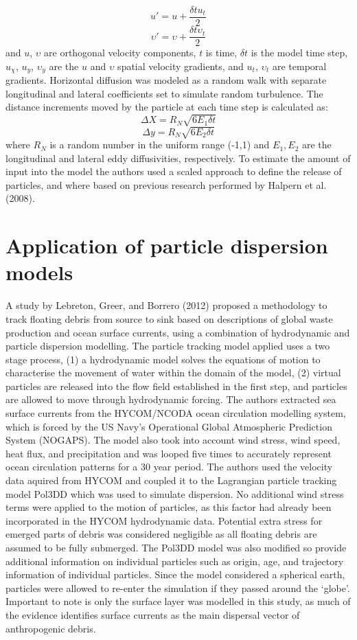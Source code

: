 \documentclass[
]{article}
\begin{document}
\[u'= u + \frac{\delta tu_t}{2}\]
\[\upsilon'=\upsilon + \frac{\delta t\upsilon_t}{2}\] and \(u\),
\(\upsilon\) are orthogonal velocity components, \(t\) is time,
\(\delta t\) is the model time step, \(u_\chi\), \(u_y\), \(\upsilon_y\)
are the \(u\) and \(\upsilon\) spatial velocity gradients, and \(u_t\),
\(\upsilon_t\) are temporal gradients. Horizontal diffusion was modeled
as a random walk with separate longitudinal and lateral coefficients set
to simulate random turbulence. The distance increments moved by the
particle at each time step is calculated as:
\[\Delta X = R_N \sqrt{6E_1\delta t}\]
\[\Delta y = R_N\sqrt{6E_2\delta t}\] where \(R_N\) is a random number
in the uniform range (-1,1) and \(E_1,E_2\) are the longitudinal and
lateral eddy diffusivities, respectively. To estimate the amount of
input into the model the authors used a scaled approach to define the
release of particles, and where based on previous research performed by
Halpern et al. (2008).

\hypertarget{application-of-particle-dispersion-models}{%
\section{Application of particle dispersion
models}\label{application-of-particle-dispersion-models}}

A study by Lebreton, Greer, and Borrero (2012) proposed a methodology to
track floating debris from source to sink based on descriptions of
global waste production and ocean surface currents, using a combination
of hydrodynamic and particle dispersion modelling. The particle tracking
model applied uses a two stage process, (1) a hydrodynamic model solves
the equations of motion to characterise the movement of water within the
domain of the model, (2) virtual particles are released into the flow
field established in the first step, and particles are allowed to move
through hydrodynamic forcing. The authors extracted sea surface currents
from the HYCOM/NCODA ocean circulation modelling system, which is forced
by the US Navy's Operational Global Atmospheric Prediction System
(NOGAPS). The model also took into account wind stress, wind speed, heat
flux, and precipitation and was looped five times to accurately
represent ocean circulation patterns for a 30 year period. The authors
used the velocity data aquired from HYCOM and coupled it to the
Lagrangian particle tracking model Pol3DD which was used to simulate
dispersion. No additional wind stress terms were applied to the motion
of particles, as this factor had already been incorporated in the HYCOM
hydrodynamic data. Potential extra stress for emerged parts of debris
was considered negligible as all floating debris are assumed to be fully
submerged. The Pol3DD model was also modified so provide additional
information on individual particles such as origin, age, and trajectory
information of individual particles. Since the model considered a
spherical earth, particles were allowed to re-enter the simulation if
they passed around the `globe'. Important to note is only the surface
layer was modelled in this study, as much of the evidence identifies
surface currents as the main dispersal vector of anthropogenic debris.
\end{document}
